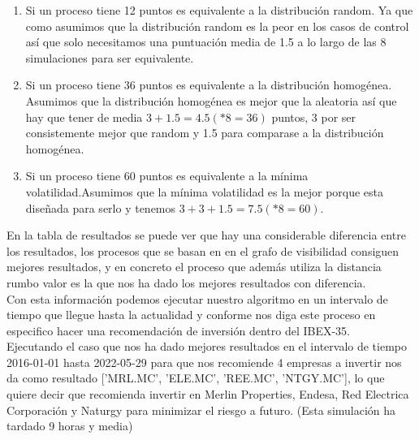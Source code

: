 \documentclass[12pt,a4paper]{article}
\begin{document}
			\begin{enumerate}
			\item 		Si un proceso tiene 12 puntos es equivalente a la distribución random. Ya que como asumimos que la distribución random es la peor en los casos de control así que solo necesitamos una puntuación media de 1.5 a lo largo de las 8 simulaciones para ser equivalente.\\
			\item 		Si un proceso tiene 36 puntos es equivalente a la distribución homogénea. Asumimos que la distribución homogénea es mejor que la aleatoria así que hay que tener de media $3+1.5=4.5 (*8=36)$ puntos, 3 por ser consistemente mejor que random y 1.5 para comparase a la distribución homogénea.\\
			\item 		Si un proceso tiene 60 puntos es equivalente a la mínima volatilidad.Asumimos que la mínima volatilidad es la mejor porque esta diseñada para serlo y tenemos $3+3+1.5=7.5 (*8=60)$.\\

	\end{enumerate}	
		En la tabla de resultados se puede ver que hay una considerable diferencia entre los resultados, los procesos que se basan en en el grafo de visibilidad consiguen mejores resultados, y en concreto el proceso que además utiliza la distancia rumbo valor es la que nos ha dado los mejores resultados con diferencia.\\
		Con esta información podemos ejecutar nuestro algoritmo en un intervalo de tiempo que llegue hasta la actualidad y conforme nos diga este proceso en especifico hacer una recomendación de inversión dentro del IBEX-35.\\
	Ejecutando el caso que nos ha dado mejores resultados en el intervalo de tiempo 2016-01-01 hasta 2022-05-29 para que nos recomiende 4 empresas a invertir nos da como resultado ['MRL.MC', 'ELE.MC', 'REE.MC', 'NTGY.MC'], lo que quiere decir que recomienda invertir en Merlin Properties, Endesa, Red Electrica Corporación y Naturgy para minimizar el riesgo a futuro. (Esta simulación ha tardado 9 horas y media)
\pagebreak
\end{document}

